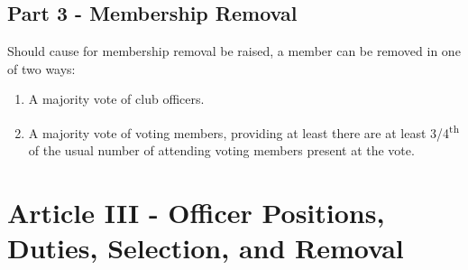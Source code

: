 \documentclass{article}
\begin{document}
	\subsection{Part 3 - Membership Removal}

	Should cause for membership removal be raised, a member can be removed in
one of two ways: \begin{enumerate} \item A majority vote of club officers.
		\item A majority vote of voting members, providing at least there are
			at least 3/4\textsuperscript{th} of the usual number of attending
	voting members present at the vote.  \end{enumerate}

	\section{Article III - Officer Positions, Duties, Selection, and Removal}




\end{document}
